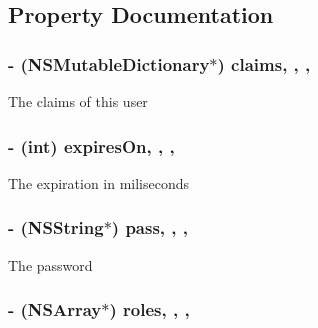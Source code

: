 \subsection{Property Documentation}
\hypertarget{interface_k_z_user_a318bcfa5e1e27c031e963144c4d5182b}{
\subsubsection[{claims}]{\setlength{\rightskip}{0pt plus 5cm}-\/ (N\-S\-Mutable\-Dictionary$\ast$) claims\hspace{0.3cm}{\ttfamily [read]}, {\ttfamily [write]}, {\ttfamily [nonatomic]}, {\ttfamily [strong]}}}\label{interface_k_z_user_a318bcfa5e1e27c031e963144c4d5182b}
The claims of this user \hypertarget{interface_k_z_user_a297647adfd1901441e760c7509b5ccec}{
\subsubsection[{expires\-On}]{\setlength{\rightskip}{0pt plus 5cm}-\/ (int) expires\-On\hspace{0.3cm}{\ttfamily [read]}, {\ttfamily [write]}, {\ttfamily [nonatomic]}, {\ttfamily [assign]}}}\label{interface_k_z_user_a297647adfd1901441e760c7509b5ccec}
The expiration in miliseconds \hypertarget{interface_k_z_user_a478bd400425d7301f092393e7d5257f0}{
\subsubsection[{pass}]{\setlength{\rightskip}{0pt plus 5cm}-\/ (N\-S\-String$\ast$) pass\hspace{0.3cm}{\ttfamily [read]}, {\ttfamily [write]}, {\ttfamily [nonatomic]}, {\ttfamily [strong]}}}\label{interface_k_z_user_a478bd400425d7301f092393e7d5257f0}
The password \hypertarget{interface_k_z_user_aff87e2dff9f8d236f7fd04e6eec7e6b3}{
\subsubsection[{roles}]{\setlength{\rightskip}{0pt plus 5cm}-\/ (N\-S\-Array$\ast$) roles\hspace{0.3cm}{\ttfamily [read]}, {\ttfamily [write]}, {\ttfamily [nonatomic]}, {\ttfamily [strong]}}}\label{interface_k_z_user_aff87e2dff9f8d236f7fd04e6eec7e6b3}
